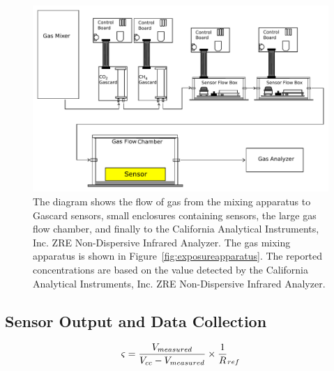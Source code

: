 \documentclass[sensors,article,submit,moreauthors,pdftex]{Definitions/mdpi}
\begin{document}
			\begin{figure}[!t]
				\centering
				\includegraphics[width=\columnwidth]{honey2.pdf}
				\caption{The diagram shows the flow of gas from the mixing apparatus to Gascard sensors, small enclosures containing sensors, the large gas flow chamber, and finally to the California Analytical Instruments, Inc. ZRE Non-Dispersive Infrared Analyzer.
				The gas mixing apparatus is shown in Figure~\ref{fig:exposureapparatus}.
				The reported concentrations are based on the value detected by the California Analytical Instruments, Inc. ZRE Non-Dispersive Infrared Analyzer.}
				\label{fig:exposureapparatus2}
			\end{figure}
			
		\subsection{Sensor Output and Data Collection}
		\label{sec:method_data}
		
			\begin{equation}
				\label{eq:vtos}
				\varsigma = \frac{V_{measured}}{V_{cc}-V_{measured}}\times \frac{1}R_{ref}\\
			\end{equation}
			
\end{document}
